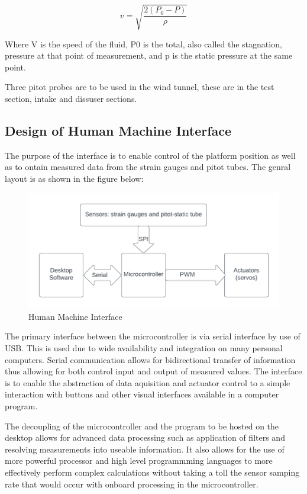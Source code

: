 $$ v = \sqrt{\frac{2(P_0 - P)}{\rho}}$$

Where V is the speed of the fluid, P0 is the total, also called the stagnation, pressure at that point of measurement, and p is the static pressure at the same point.

Three pitot probes are to be used in the wind tunnel, these are in the test section, intake and dissuser sections.

\subsection{Design of Human Machine Interface}
The purpose of the interface is to enable control of the platform position as well as to ontain measured data from the strain gauges and pitot tubes. 
The genral layout is as shown in the figure below:
\begin{center}
\begin{figure}
\centering
\includegraphics{Figures/interface}
\caption[Human Machine Interface]{Human Machine Interface}
\end{figure}
\end{center}

The primary interface between the microcontroller is via serial interface by use of USB. This is used due to wide availability and integration on many personal computers. Serial communication allows for bidirectional transfer of information thus allowing for both control input and output of measured values. The interface is to enable the abstraction of data aquisition and actuator control to a simple interaction with buttons and other visual interfaces available in a computer program.

The decoupling of the microcontroller and the program to be hosted on the desktop allows for advanced data processing such as application of filters and resolving measurements into useable information. It also allows for the use of more powerful processor and high level programmming languages to more effectively perform complex calculations without taking a toll the sensor samping rate that would occur with onboard processing in the microcontroller.
